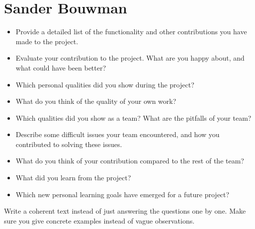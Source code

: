 \section{Sander Bouwman}
\begin{itemize}
    \item Provide a detailed list of the functionality and other 
    contributions you have made to the project.
    \item Evaluate your contribution to the project. What are you happy 
    about, and what could have been better?
    \item Which personal qualities did you show during the project?
    \item What do you think of the quality of your own work?
    \item Which qualities did you show as a team? What are the pitfalls of your team?
    \item Describe some difficult issues your team encountered, and how you 
    contributed to solving these issues.
    \item What do you think of your contribution compared to the rest of 
    the team?
    \item What did you learn from the project?
    \item Which new personal learning goals have emerged for a future project?
\end{itemize}

Write  a  coherent  text  instead  of  just  answering  the  questions  one  by  one.   Make
sure you give concrete examples instead of vague observations.

